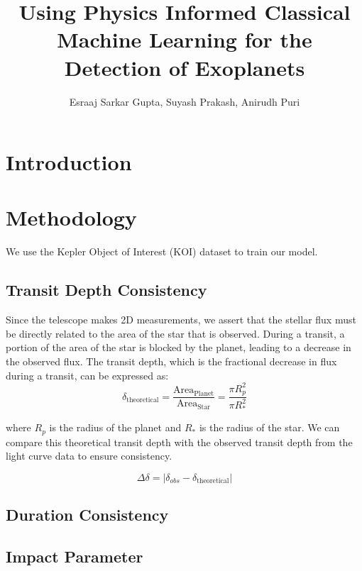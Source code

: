 \documentclass{article}
\title{Using Physics Informed Classical Machine Learning for the Detection of Exoplanets}
\author{Esraaj Sarkar Gupta, Suyash Prakash, Anirudh Puri}
\begin{document}
\maketitle

\section{Introduction}


\section{Methodology}
We use the Kepler Object of Interest (KOI) dataset to train our model.

\subsection{Transit Depth Consistency}
Since the telescope makes 2D measurements, we assert that the stellar flux must be directly related to the area of the star that is observed. During a transit, a portion of the area of the star is blocked by the planet, leading to a decrease in the observed flux. The transit depth, which is the fractional decrease in flux during a transit, can be expressed as:
\begin{equation}
    \delta_\text{theoretical} = \frac{\text{Area}_\text{Planet}}{\text{Area}_\text{Star}} = \frac{\pi R_p^2}{\pi R_*^2}
\end{equation}

where $R_p$ is the radius of the planet and $R_*$ is the radius of the star. We can compare this theoretical transit depth with the observed transit depth from the light curve data to ensure consistency.

\begin{equation}
    \Delta\delta = \Bigg|\delta_{obs} - \delta_\text{theoretical}\Bigg|
\end{equation}

\subsection{Duration Consistency}


\subsection{Impact Parameter}
\end{document}
